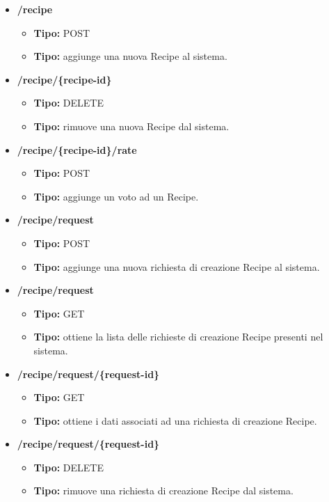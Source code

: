 \begin{itemize}
  \item \textbf{/recipe}
  \begin{itemize}
    \item \textbf{Tipo:} POST
    \item \textbf{Tipo:} aggiunge una nuova Recipe al sistema.
  \end{itemize}
  \item \textbf{/recipe/\{recipe-id\}}
  \begin{itemize}
    \item \textbf{Tipo:} DELETE
    \item \textbf{Tipo:} rimuove una nuova Recipe dal sistema.
  \end{itemize}
  \item \textbf{/recipe/\{recipe-id\}/rate}
  \begin{itemize}
    \item \textbf{Tipo:} POST
    \item \textbf{Tipo:} aggiunge un voto ad un Recipe.
  \end{itemize}


  \item \textbf{/recipe/request}
  \begin{itemize}
    \item \textbf{Tipo:} POST
    \item \textbf{Tipo:} aggiunge una nuova richiesta di creazione Recipe al sistema.
  \end{itemize}
  \item \textbf{/recipe/request}
  \begin{itemize}
    \item \textbf{Tipo:} GET
    \item \textbf{Tipo:} ottiene la lista delle richieste di creazione Recipe presenti nel sistema.
  \end{itemize}
  \item \textbf{/recipe/request/\{request-id\}}
  \begin{itemize}
    \item \textbf{Tipo:} GET
    \item \textbf{Tipo:} ottiene i dati associati ad una richiesta di creazione Recipe.
  \end{itemize}
  \item \textbf{/recipe/request/\{request-id\}}
  \begin{itemize}
    \item \textbf{Tipo:} DELETE
    \item \textbf{Tipo:} rimuove una richiesta di creazione Recipe dal sistema.
  \end{itemize}

\end{itemize}
